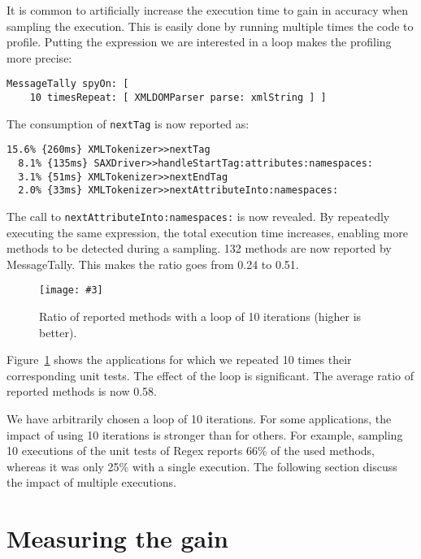 \documentclass{sig-alternate}
\newcommand{\ct}{\lstinline[backgroundcolor=\color{white},basicstyle=\footnotesize\ttfamily]}
\newcommand{\fig}[4]{
	\begin{figure}[#1]
		\centering
		\texttt{[image: \#3]}
		\caption{\label{fig:#3}#4}
	\end{figure}}
\newcommand{\seclabel}[1]{\label{sec:#1}}
\newcommand{\figref}[1]{Figure~\ref{fig:#1}}
\begin{document}
It is common to artificially increase the execution time to gain in accuracy when sampling the execution. This is easily done by running multiple times the code to profile. Putting the expression we are interested in a loop makes the profiling more precise:

\begin{lstlisting}
MessageTally spyOn: [  
	10 timesRepeat: [ XMLDOMParser parse: xmlString ] ]
\end{lstlisting}

The consumption of \ct{nextTag} is now reported as:

\begin{lstlisting}
15.6% {260ms} XMLTokenizer>>nextTag
  8.1% {135ms} SAXDriver>>handleStartTag:attributes:namespaces:
  3.1% {51ms} XMLTokenizer>>nextEndTag
  2.0% {33ms} XMLTokenizer>>nextAttributeInto:namespaces:
\end{lstlisting}

The call to \ct{nextAttributeInto:namespaces:} is now revealed. By repeatedly executing the same expression, the total execution time increases, enabling more methods to be detected during a sampling. 132 methods are now reported by MessageTally. This makes the ratio goes from 0.24 to 0.51.



\fig{h}{0.5}{RatioAfter10Loops}{Ratio of reported methods with a loop of 10 iterations (higher is better).}

\figref{RatioAfter10Loops} shows the applications for which we repeated 10 times their corresponding unit tests. The effect of the loop is significant. The average ratio of reported methods is now 0.58. 

We have arbitrarily chosen a loop of 10 iterations. For some applications, the impact of using 10 iterations is stronger than for others. For example, sampling 10 executions of the unit tests of Regex reports 66\% of the used methods, whereas it was only 25\% with a single execution. The following section discuss the impact of multiple executions.

\section{Measuring the gain} \seclabel{measuringTheGain}
 
\end{document}
